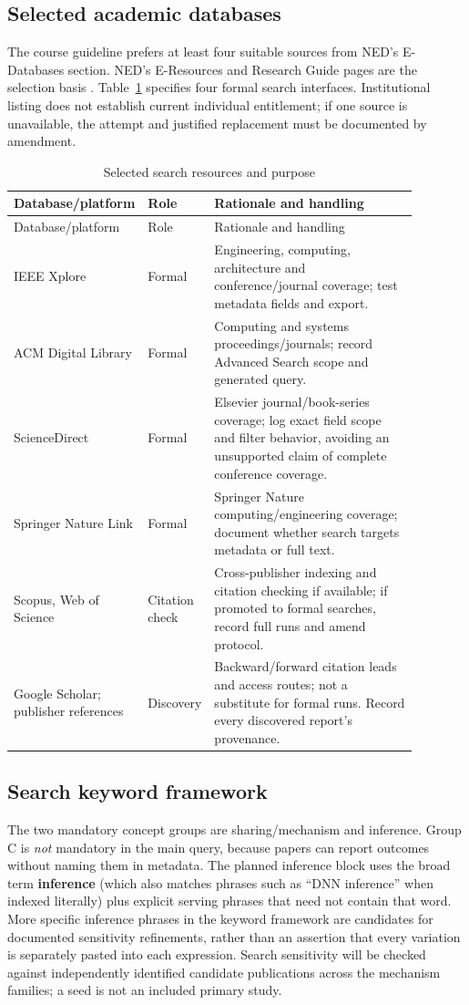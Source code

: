 \documentclass[12pt,a4paper]{article}
\newcommand{\term}[1]{\textbf{#1}}
\begin{document}
\subsection{Selected academic databases}
The course guideline prefers at least four suitable sources from NED's E-Databases section. NED's E-Resources and Research Guide pages are the selection basis \cite{nedResources,nedGuide}. Table~\ref{tab:databases} specifies four formal search interfaces. Institutional listing does not establish current individual entitlement; if one source is unavailable, the attempt and justified replacement must be documented by amendment.

\begin{longtable}{p{0.21\linewidth}p{0.13\linewidth}p{0.54\linewidth}}
\caption{Selected search resources and purpose}\label{tab:databases}\\\toprule Database/platform & Role & Rationale and handling\\\midrule\endfirsthead
\toprule Database/platform & Role & Rationale and handling\\\midrule\endhead
IEEE Xplore & Formal & Engineering, computing, architecture and conference/journal coverage; test metadata fields and export.\\
ACM Digital Library & Formal & Computing and systems proceedings/journals; record Advanced Search scope and generated query.\\
ScienceDirect & Formal & Elsevier journal/book-series coverage; log exact field scope and filter behavior, avoiding an unsupported claim of complete conference coverage.\\
Springer Nature Link & Formal & Springer Nature computing/engineering coverage; document whether search targets metadata or full text.\\
Scopus, Web of Science & Citation check & Cross-publisher indexing and citation checking if available; if promoted to formal searches, record full runs and amend protocol.\\
Google Scholar; publisher references & Discovery & Backward/forward citation leads and access routes; not a substitute for formal runs. Record every discovered report's provenance.\\\bottomrule
\end{longtable}

\subsection{Search keyword framework}
The two mandatory concept groups are sharing/mechanism and inference. Group C is \emph{not} mandatory in the main query, because papers can report outcomes without naming them in metadata. The planned inference block uses the broad term \term{inference} (which also matches phrases such as ``DNN inference'' when indexed literally) plus explicit serving phrases that need not contain that word. More specific inference phrases in the keyword framework are candidates for documented sensitivity refinements, rather than an assertion that every variation is separately pasted into each expression. Search sensitivity will be checked against independently identified candidate publications across the mechanism families; a seed is not an included primary study.
\end{document}

